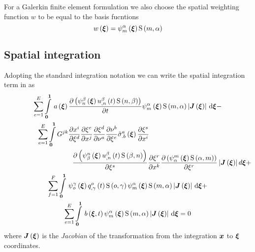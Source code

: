 For a Galerkin finite element formulation we also choose the spatial weighting
function $w$ to be equal to the basis fucntions \ie
\begin{equation}
   w\left(  \boldsymbol{\xi}  \right) =   \psi_{m}^{\alpha} \left(  \boldsymbol{\xi}  \right)     \mathrm{S} \left( m,\alpha \right)  
\end{equation}

\subsection{Spatial integration}

Adopting the standard integration notation we can write the spatial
integration term in  as
\begin{multline}
  \dsum_{e=1}^{E}\gint{\vectr{0}}{\vectr{1}}{\fnof{a}{\vectr{\xi}}
    \delby{\pbrac{\gbfn{n}{\beta}{\vectr{\xi}}\fnof{\nodedof{u}{\beta}{n}}{t}
        \gsf{n}{\beta}}}{t}\gbfn{m}{\alpha}{\vectr{\xi}}\gsf{m}{\alpha}
    \abs{\fnof{\matr{J}}{\vectr{\xi}}}}{\vectr{\xi}} - \\
  \dsum_{e=1}^{E}\dintl{\vectr{0}}{\vectr{1}}G^{jk}\delby{x^{i}}{\xi^{d}}\delby{\xi^{e}}{x^{j}}
  \delby{\xi^{d}}{\nu^{a}}\delby{\nu^{b}}{\xi^{e}}\fnof{{\tilde{\sigma}}^{a}_{.b}}{\vectr{\xi}}
  \delby{\xi^{s}}{x^{i}}
  \quad\quad\quad\quad\quad\quad\quad\quad\quad\quad \\ \quad\quad\quad\quad\quad\quad\quad\quad\quad\quad
  \delby{\pbrac{\gbfn{\beta}{n}{\vectr{\xi}}\fnof{\nodedof{u}{\beta}{n}}{t}
      \gsf{\beta}{n}}}{\xi^{s}}\delby{\xi^{r}}{x^{k}}\delby{
    \pbrac{\gbfn{\alpha}{m}{\vectr{\xi}}\gsf{\alpha}{m}}}{\xi^{r}}
  \abs{\fnof{\matr{J}}{\vectr{\xi}}}d\vectr{\xi} + \\
  \dsum_{f=1}^{F}\gint{\vectr{0}}{\vectr{1}}{\gbfn{o}{\gamma}{\vectr{\xi}}
    \fnof{\nodedof{q}{o}{\gamma}}{t}\gsf{o}{\gamma}\gbfn{m}{\alpha}{\vectr{\xi}}
    \gsf{m}{\alpha}\abs{\fnof{\matr{J}}{\vectr{\xi}}}}{\vectr{\xi}} + \\
  \dsum_{e=1}^{E}\gint{\vectr{0}}{\vectr{1}}{\fnof{b}{\vectr{\xi},t}\gbfn{m}{\alpha}{\vectr{\xi}}
    \gsf{m}{\alpha}\abs{\fnof{\matr{J}}{\vectr{\xi}}}}{\vectr{\xi}} = 0
  \label{eqn:diffusionspatialintegration1}
\end{multline}
where $\fnof{\matr{J}}{\vectr{\xi}}$ is the \emph{Jacobian} of the
transformation from the integration $ \boldsymbol{x} $ to $ \boldsymbol{\xi} $ coordinates.

